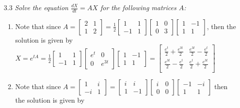 \documentclass[12pt, letterpaper]{article}
\begin{document}
\begin{enumerate}
\begin{enumerate}
	\end{enumerate}
	\item[3.3] \textit{Solve the equation $\frac{dX}{
dt} = AX$ for the following matrices $A$:}
	\begin{enumerate}
		\item Note that since $A = \begin{bmatrix}
		2 & 1\\ 1 & 2
		\end{bmatrix}
		=
		\frac{1}{2} \begin{bmatrix} 1 & 1\\-1 & 1 \end{bmatrix}\begin{bmatrix}1 & 0\\ 0 & 3 \end{bmatrix}\begin{bmatrix}1 & -1\\1 & 1 \end{bmatrix}		 $, then the solution is given by 
		$X = e^{tA} = \frac{1}{2} \begin{bmatrix} 1 & 1\\-1 & 1 \end{bmatrix}\begin{bmatrix}e^t & 0\\ 0 & e^{3t} \end{bmatrix}\begin{bmatrix}1 & -1\\1 & 1 \end{bmatrix}	= \begin{bmatrix}
		\frac{e^t}{2}+\frac{e^{3 t}}{2} & \frac{e^{3
   t}}{2}-\frac{e^t}{2} \\
 \frac{e^{3 t}}{2}-\frac{e^t}{2} & \frac{e^t}{2}+\frac{e^{3
   t}}{2} \\
		\end{bmatrix}$
		\item Note that since $A = \begin{bmatrix}
		1 & i\\ -i & 1
		\end{bmatrix}		
		=   \begin{bmatrix} i & i\\1 & -1\end{bmatrix}\begin{bmatrix}i & 0\\0&0\end{bmatrix}\begin{bmatrix}
		-1 & -i\\ 1&1
		\end{bmatrix}$ then the solution is given by 

\end{enumerate}
\end{enumerate}
\end{document}

